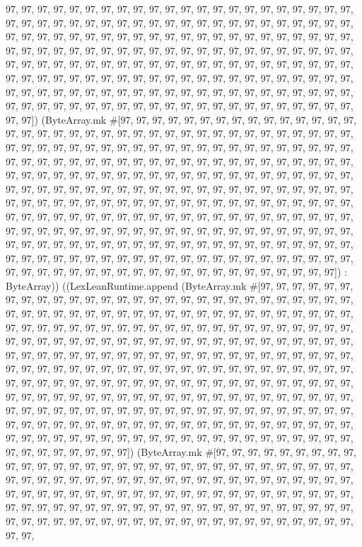 \documentclass[11pt]{article}
\begin{document}
97, 97, 97, 97, 97, 97, 97, 97, 97, 97, 97, 97, 97, 97, 97, 97, 97, 97, 97, 97, 97, 97, 97, 97, 97, 97, 97, 97, 97, 97, 97, 97, 97, 97, 97, 97, 97, 97, 97, 97, 97, 97, 97, 97, 97, 97, 97, 97, 97, 97, 97, 97, 97, 97, 97, 97, 97, 97, 97, 97, 97, 97, 97, 97, 97, 97, 97, 97, 97, 97, 97, 97, 97, 97, 97, 97, 97, 97, 97, 97, 97, 97, 97, 97, 97, 97, 97, 97, 97, 97, 97, 97, 97, 97, 97, 97, 97, 97, 97, 97, 97, 97, 97, 97, 97, 97, 97, 97, 97, 97, 97, 97, 97, 97, 97, 97, 97, 97, 97, 97, 97, 97, 97, 97, 97, 97, 97, 97, 97, 97, 97, 97, 97, 97, 97, 97, 97, 97, 97, 97, 97, 97, 97, 97, 97, 97, 97, 97, 97, 97, 97, 97, 97, 97, 97, 97, 97, 97, 97, 97, 97, 97, 97, 97, 97, 97, 97, 97, 97, 97, 97, 97, 97, 97, 97, 97, 97, 97]) (ByteArray.mk \#[97, 97, 97, 97, 97, 97, 97, 97, 97, 97, 97, 97, 97, 97, 97, 97, 97, 97, 97, 97, 97, 97, 97, 97, 97, 97, 97, 97, 97, 97, 97, 97, 97, 97, 97, 97, 97, 97, 97, 97, 97, 97, 97, 97, 97, 97, 97, 97, 97, 97, 97, 97, 97, 97, 97, 97, 97, 97, 97, 97, 97, 97, 97, 97, 97, 97, 97, 97, 97, 97, 97, 97, 97, 97, 97, 97, 97, 97, 97, 97, 97, 97, 97, 97, 97, 97, 97, 97, 97, 97, 97, 97, 97, 97, 97, 97, 97, 97, 97, 97, 97, 97, 97, 97, 97, 97, 97, 97, 97, 97, 97, 97, 97, 97, 97, 97, 97, 97, 97, 97, 97, 97, 97, 97, 97, 97, 97, 97, 97, 97, 97, 97, 97, 97, 97, 97, 97, 97, 97, 97, 97, 97, 97, 97, 97, 97, 97, 97, 97, 97, 97, 97, 97, 97, 97, 97, 97, 97, 97, 97, 97, 97, 97, 97, 97, 97, 97, 97, 97, 97, 97, 97, 97, 97, 97, 97, 97, 97, 97, 97, 97, 97, 97, 97, 97, 97, 97, 97, 97, 97, 97, 97, 97, 97, 97, 97, 97, 97, 97, 97, 97, 97, 97, 97, 97, 97, 97, 97, 97, 97, 97, 97, 97, 97, 97, 97, 97, 97, 97, 97, 97, 97, 97, 97, 97, 97, 97, 97, 97, 97, 97, 97, 97, 97, 97, 97, 97, 97, 97, 97, 97, 97, 97, 97, 97, 97, 97, 97, 97, 97, 97, 97, 97, 97, 97, 97]) : ByteArray)) ((LexLeanRuntime.append (ByteArray.mk \#[97, 97, 97, 97, 97, 97, 97, 97, 97, 97, 97, 97, 97, 97, 97, 97, 97, 97, 97, 97, 97, 97, 97, 97, 97, 97, 97, 97, 97, 97, 97, 97, 97, 97, 97, 97, 97, 97, 97, 97, 97, 97, 97, 97, 97, 97, 97, 97, 97, 97, 97, 97, 97, 97, 97, 97, 97, 97, 97, 97, 97, 97, 97, 97, 97, 97, 97, 97, 97, 97, 97, 97, 97, 97, 97, 97, 97, 97, 97, 97, 97, 97, 97, 97, 97, 97, 97, 97, 97, 97, 97, 97, 97, 97, 97, 97, 97, 97, 97, 97, 97, 97, 97, 97, 97, 97, 97, 97, 97, 97, 97, 97, 97, 97, 97, 97, 97, 97, 97, 97, 97, 97, 97, 97, 97, 97, 97, 97, 97, 97, 97, 97, 97, 97, 97, 97, 97, 97, 97, 97, 97, 97, 97, 97, 97, 97, 97, 97, 97, 97, 97, 97, 97, 97, 97, 97, 97, 97, 97, 97, 97, 97, 97, 97, 97, 97, 97, 97, 97, 97, 97, 97, 97, 97, 97, 97, 97, 97, 97, 97, 97, 97, 97, 97, 97, 97, 97, 97, 97, 97, 97, 97, 97, 97, 97, 97, 97, 97, 97, 97, 97, 97, 97, 97, 97, 97, 97, 97, 97, 97, 97, 97, 97, 97, 97, 97, 97, 97, 97, 97, 97, 97, 97, 97, 97, 97, 97, 97, 97, 97, 97, 97, 97, 97, 97, 97, 97, 97, 97, 97, 97, 97, 97, 97, 97, 97, 97, 97, 97, 97, 97, 97, 97, 97, 97, 97]) (ByteArray.mk \#[97, 97, 97, 97, 97, 97, 97, 97, 97, 97, 97, 97, 97, 97, 97, 97, 97, 97, 97, 97, 97, 97, 97, 97, 97, 97, 97, 97, 97, 97, 97, 97, 97, 97, 97, 97, 97, 97, 97, 97, 97, 97, 97, 97, 97, 97, 97, 97, 97, 97, 97, 97, 97, 97, 97, 97, 97, 97, 97, 97, 97, 97, 97, 97, 97, 97, 97, 97, 97, 97, 97, 97, 97, 97, 97, 97, 97, 97, 97, 97, 97, 97, 97, 97, 97, 97, 97, 97, 97, 97, 97, 97, 97, 97, 97, 97, 97, 97, 97, 97, 97, 97, 97, 97, 97, 97, 97, 97, 97, 97, 97, 97, 97, 97, 97, 97, 97, 97, 97, 97, 97, 
\end{document}
